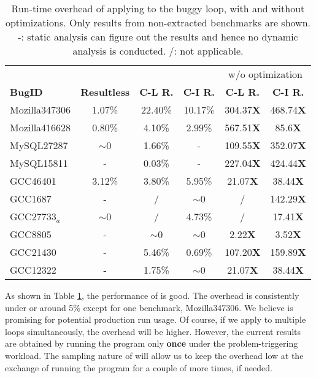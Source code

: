 \begin{table}
  \centering
  \scriptsize
  \newcommand{\Yes}[1]{\checkmark{}$_#1$}
  \newcommand{\No}[0]{-}
  \begin{tabular}{lccccc}
    \toprule
	    & \multicolumn{3}{c}{\Tool} & \multicolumn{2}{c}{w/o optimization} \\
     \cmidrule(lr){2-4}
     \cmidrule(lr){5-6}
     {\bf BugID}  & {\bf Resultless}  &  {\bf C-L R. } & {\bf C-I R. }  & {\bf C-L R.}  & {\bf C-I R. } \\
    \midrule
    Mozilla347306 &  1.07\%           &  22.40\%       &  10.17\%       & 304.37{\bf X} & 468.74{\bf X} \\ 
    Mozilla416628 &  0.80\%           &  4.10\%        &  2.99\%        & 567.51{\bf X} & 85.6{\bf X} \\
    \midrule
     MySQL27287   & $\sim$0           &   1.66\%       &   -            & 109.55{\bf X} & 352.07{\bf X} \\
     MySQL15811   &  -                &   0.03\%       &   -            & 227.04{\bf X} & 424.44{\bf X} \\
    \midrule
      GCC46401    & 3.12\%         & 3.80\%            &  5.95\%        & 21.07{\bf X}  & 38.44{\bf X}\\ 
      GCC1687     & -              & /                 &  $\sim$0       &   /           & 142.29{\bf X} \\
      GCC27733$_a$    & $\sim$0        & /                 &  4.73\%        &   /           & 17.41{\bf X}     \\
      GCC8805     & -              & $\sim$0           & $\sim$0        & 2.22{\bf X}   &  3.52{\bf X}\\
      GCC21430    & -              & 5.46\%            &   0.69\%       & 107.20{\bf X} & 159.89{\bf X} \\
      GCC12322    & -              & 1.75\%            &  $\sim$0       & 21.07{\bf X}  & 38.44{\bf X} \\
   \bottomrule
   \end{tabular}
  \caption{Run-time overhead of applying \Tool to the buggy loop, with and
    without optimizations. 
    Only results from non-extracted benchmarks are shown. 
  -: static analysis can figure out the results and hence no dynamic analysis is conducted.
  /: not applicable. }
  \label{tab:performance}
\end{table}




As shown in Table \ref{tab:performance}, 
the performance of \Tool is good. The overhead is consistently under or around 5\% 
except for one benchmark, Mozilla347306. We believe \Tool is promising for potential production
run usage. Of course, if we apply \Tool to multiple loops simultaneously,
the overhead will be higher. However, the current results are obtained by running the
program only \textbf{once} under the problem-triggering workload. The sampling nature
of \Tool will allow us to keep the overhead low at the exchange of running the program for
a couple of more times, if needed.

